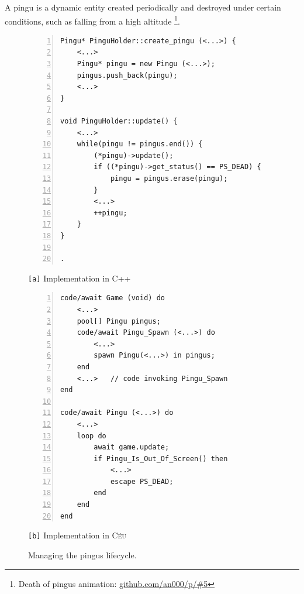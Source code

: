 \documentclass{vgtc}                          %
\newcommand{\CEU}{\textsc{C\'{e}u}\xspace}
\newcommand{\code}[1] {{\small{\texttt{#1}}}}
\newcommand{\ax}{\code{[a]}\xspace}
\newcommand{\bx}{\code{[b]}\xspace}
\begin{document}

A pingu is a dynamic entity created periodically and destroyed under certain
conditions, such as falling from a high altitude%
\footnote{Death of pingus animation: \url{github.com/an000/p/#5} }.
%

\begin{figure}[t]
\begin{minipage}[t]{0.50\linewidth}
\begin{lstlisting}[numbers=left,xleftmargin=3em]
Pingu* PinguHolder::create_pingu (<...>) {
    <...>
    Pingu* pingu = new Pingu (<...>);
    pingus.push_back(pingu);
    <...>
}

void PinguHolder::update() {
    <...>
    while(pingu != pingus.end()) {
        (*pingu)->update();
        if ((*pingu)->get_status() == PS_DEAD) {
            pingu = pingus.erase(pingu);
        }
        <...>
        ++pingu;
    }
}

.
\end{lstlisting}
\centering\small{\ax Implementation in C++}
\end{minipage}
%
\begin{minipage}[t]{0.50\linewidth}
\begin{lstlisting}[numbers=left,xleftmargin=3em]
code/await Game (void) do
    <...>
    pool[] Pingu pingus;
    code/await Pingu_Spawn (<...>) do
        <...>
        spawn Pingu(<...>) in pingus;
    end
    <...>   // code invoking Pingu_Spawn
end

code/await Pingu (<...>) do
    <...>
    loop do
        await game.update;
        if Pingu_Is_Out_Of_Screen() then
            <...>
            escape PS_DEAD;
        end
    end
end
\end{lstlisting}
\centering\small{\bx Implementation in \CEU}
\end{minipage}
\caption{ Managing the pingus lifecycle.
\label{lst.pingus}
}
\end{figure}
\end{document}
